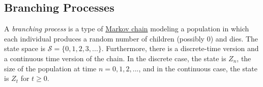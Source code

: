 \subsection{Branching Processes}

  \begin{definition}
    \label{def:branching-process}
    A \textit{branching process} is a type of \hyperref[def:markov-chain]{Markov chain} modeling a population in which each individual produces a random number of children (possibly $0$) and dies. The state space is $\mathcal{S} = \{0, 1, 2, 3, ...\}$. Furthermore, there is a discrete-time version and a continuous time version of the chain. In the discrete case, the state is $Z_n$, the size of the population at time $n = 0, 1, 2, ...$, and in the continuous case, the state is $Z_t$ for $t \geq 0$. 
  \end{definition}


